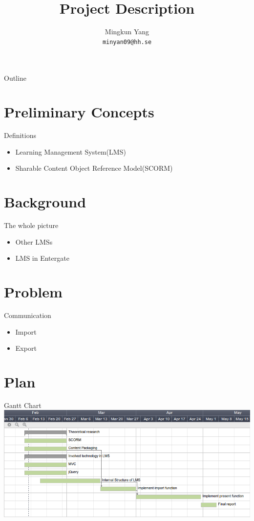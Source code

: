 \documentclass{beamer}
\title{Project Description}
\author{Mingkun Yang \\
		\texttt{minyan09@hh.se}}
\institute{
Halmstad University\\
}
\date{}
\begin{document}
\begin{frame}
	\titlepage
\end{frame}

\begin{frame}{Outline}
	\tableofcontents[pausesections]
\end{frame}

\section{Preliminary Concepts}
\begin{frame}{Definitions}
	\begin{itemize}
		\item
			Learning Management System(LMS)
			\pause
		\item
			Sharable Content Object Reference Model(SCORM)
	\end{itemize}
\end{frame}

\section{Background}
\begin{frame}{The whole picture}
	\begin{itemize}
		\item
			Other LMSs
			\pause
		\item
			LMS in Entergate
	\end{itemize}
\end{frame}

\section{Problem}
\begin{frame}{Communication}
	\begin{itemize}
		\item
			Import
		\item
			Export
	\end{itemize}
\end{frame}

\section{Plan}
\begin{frame}{Gantt Chart}
	\includegraphics[scale=0.4]{Gantt.png}
\end{frame}
\end{document}
